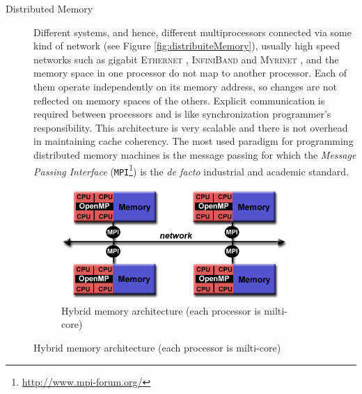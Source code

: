 \begin{description}
\begin{description}
	\item [Distributed Memory] 	Different systems, and hence, different multiprocessors connected via some kind of network (see Figure \ref{fig:distribuiteMemory}), usually high speed networks such as gigabit \textsc{Ethernet} \cite{Spurgeon:2000:EDG:336070}, \textsc{InfiniBand} \cite{Shanley:2002:INF:579371} and \textsc{Myrinet} \cite{Boden:1995:MGL:623261.623898}, and the memory space in one processor do not map to another processor. Each of them operate independently on its memory address, so changes are not reflected on memory spaces of the others. Explicit communication is required between processors and is like synchronization	programmer's responsibility.
	This architecture  is very scalable and there is not  overhead in maintaining	cache coherency. 	
	The most used paradigm for programming distributed memory machines is the
	message passing for which the \textit{Message Passing Interface} (\texttt{MPI}\footnote{\url{http://www.mpi-forum.org/}}) \cite{Forum:1994:MMI:898758,Gropp:1999:UMA:555151} is the \textit{de facto} industrial and academic standard.
\end{description}
 
 \begin{figure}
 	\centering
 	\begin{subfigure}{0.55\textwidth}
 		\centering
 			\caption{Hybrid memory architecture (each processor is milti-core)}
 		\label{fig:hybridMemory}
 		\includegraphics[width=0.95\textwidth]{./images/parallel_programming/hybrid_model}
 	

\end{subfigure}
\end{figure}
\end{description}
